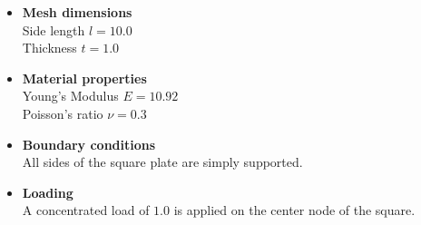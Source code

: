   \begin{itemize}
  	\item \textbf{Mesh dimensions}\\
  	Side length $l = 10.0$\\
  	Thickness $t = 1.0$
  	
  	\item \textbf{Material properties}\\
  	Young's Modulus $E = 10.92$\\
  	Poisson's ratio $\nu = 0.3$
  	
  	\item \textbf{Boundary conditions}\\
  	All sides of the square plate are simply supported.
  	
  	\item \textbf{Loading}\\
  	A concentrated load of $1.0$ is applied on the center node of the square.
  \end{itemize}
  
